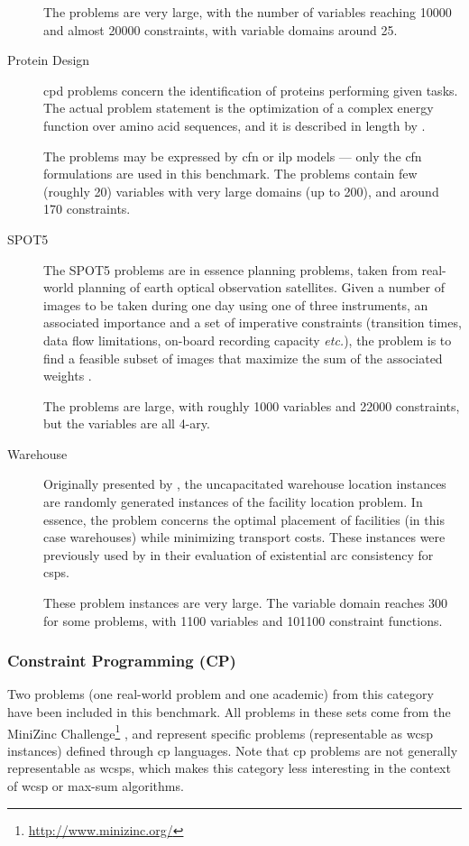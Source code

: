 \begin{description}
		The problems are very large, with the number of variables reaching \num{10000} and almost \num{20000} constraints, with variable domains around \num{25}.

	\item[Protein Design]
		\Gls{cpd} problems concern the identification of proteins performing given tasks. The actual problem statement is the optimization of a complex energy function over amino acid sequences, and it is described in length by \textcite{Allouche12}.

		The problems may be expressed by \gls{cfn} or \gls{ilp} models — only the \gls{cfn} formulations are used in this benchmark. The problems contain few (roughly \num{20}) variables with very large domains (up to \num{200}), and around \num{170} constraints.

	\item[SPOT5]
		The SPOT5 problems are in essence planning problems, taken from real-world planning of earth optical observation satellites.
		Given a number of images to be taken during one day using one of three instruments, an associated importance and a set of imperative constraints (transition times, data flow limitations, on-board recording capacity \emph{etc.}), the problem is to find a feasible subset of images that maximize the sum of the associated weights \parencite{Bensana99}.

		The problems are large, with roughly \num{1000} variables and \num{22000} constraints, but the variables are all 4-ary.

	\item[Warehouse]
		Originally presented by \textcite{Kratica01}, the uncapacitated warehouse location instances are randomly generated instances of the facility location problem. In essence, the problem concerns the optimal placement of facilities (in this case warehouses) while minimizing transport costs. These instances were previously used by \textcite{deGivry05} in their evaluation of existential arc consistency for \glspl{csp}.

		These problem instances are very large. The variable domain reaches \num{300} for some problems, with \num{1100} variables and \num{101100} constraint functions.

\end{description}

\subsubsection{Constraint Programming (CP)}
Two problems (one real-world problem and one academic) from this category have been included in this benchmark.
All problems in these sets come from the MiniZinc Challenge\footnote{\url{http://www.minizinc.org/}} \parencite[\pno~5]{deGivry14}, and represent specific problems (representable as \gls{wcsp} instances) defined through \acrlong{cp} languages.
Note that \gls{cp} problems are not generally representable as \glspl{wcsp}, which makes this category less interesting in the context of \gls{wcsp} or max-sum algorithms.

